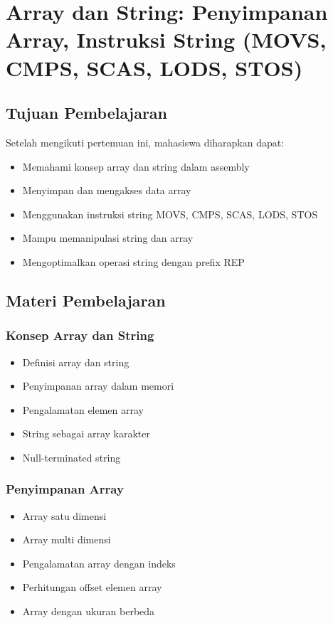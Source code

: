 \chapter{Array dan String: Penyimpanan Array, Instruksi String (MOVS, CMPS, SCAS, LODS, STOS)}

\section{Tujuan Pembelajaran}
Setelah mengikuti pertemuan ini, mahasiswa diharapkan dapat:
\begin{itemize}
\item Memahami konsep array dan string dalam assembly
\item Menyimpan dan mengakses data array
\item Menggunakan instruksi string MOVS, CMPS, SCAS, LODS, STOS
\item Mampu memanipulasi string dan array
\item Mengoptimalkan operasi string dengan prefix REP
\end{itemize}

\section{Materi Pembelajaran}

\subsection{Konsep Array dan String}
\begin{itemize}
\item Definisi array dan string
\item Penyimpanan array dalam memori
\item Pengalamatan elemen array
\item String sebagai array karakter
\item Null-terminated string
\end{itemize}

\subsection{Penyimpanan Array}
\begin{itemize}
\item Array satu dimensi
\item Array multi dimensi
\item Pengalamatan array dengan indeks
\item Perhitungan offset elemen array
\item Array dengan ukuran berbeda
\end{itemize}

